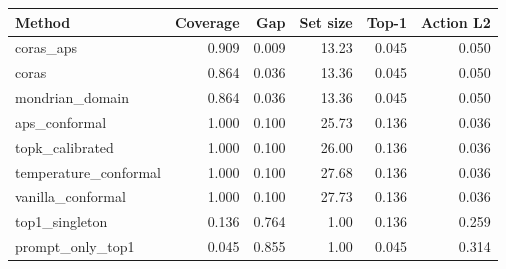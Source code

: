 \begin{tabular}{lrrrrr}
\toprule
Method & Coverage & Gap & Set size & Top-1 & Action L2 \\
\midrule
coras\_aps & 0.909 & 0.009 & 13.23 & 0.045 & 0.050 \\
coras & 0.864 & 0.036 & 13.36 & 0.045 & 0.050 \\
mondrian\_domain & 0.864 & 0.036 & 13.36 & 0.045 & 0.050 \\
aps\_conformal & 1.000 & 0.100 & 25.73 & 0.136 & 0.036 \\
topk\_calibrated & 1.000 & 0.100 & 26.00 & 0.136 & 0.036 \\
temperature\_conformal & 1.000 & 0.100 & 27.68 & 0.136 & 0.036 \\
vanilla\_conformal & 1.000 & 0.100 & 27.73 & 0.136 & 0.036 \\
top1\_singleton & 0.136 & 0.764 & 1.00 & 0.136 & 0.259 \\
prompt\_only\_top1 & 0.045 & 0.855 & 1.00 & 0.045 & 0.314 \\
\bottomrule
\end{tabular}